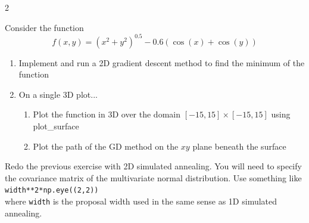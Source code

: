 \documentclass[12pt]{article}%
\newcommand{\code}[1]{\texttt{#1}}
\begin{document}
\begin{multicols*}{2}



\begin{Exercise}[origin={25 points, Python}]

Consider the function
\begin{equation*}
	f(x,y) = (x^2+y^2)^{0.5} - 0.6(\cos(x)+\cos(y))
\end{equation*}

\begin{enumerate}
	\item Implement and run a 2D gradient descent method to find the minimum of the function
	\item On a single 3D plot...
	\begin{enumerate}
		\item Plot the function in 3D over the domain $[-15,15] \times [-15,15]$ using plot\_surface
		\item Plot the path of the GD method on the $xy$ plane beneath the surface
	\end{enumerate}
\end{enumerate}

\end{Exercise}

\begin{Exercise}[origin={25 points, Python}]

Redo the previous exercise with 2D simulated annealing. You will need to specify the covariance matrix of the multivariate normal distribution. Use something like \\

\code{width**2*np.eye((2,2))} \\

where \code{width} is the proposal width used in the same sense as 1D simulated annealing.

\end{Exercise}


\vfill\null
\columnbreak


\begin{Exercise}[origin={25 points, Python}]


\end{Exercise}
\end{multicols*}
\end{document}
